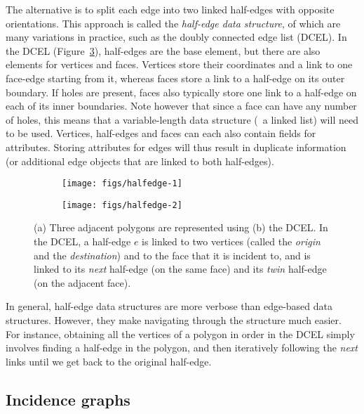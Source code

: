 The alternative is to split each edge into two linked half-edges with opposite orientations.
This approach is called the \emph{half-edge data structure}, of which are many variations in practice, such as the doubly connected edge list (DCEL).
In the DCEL (Figure~\ref{fig:halfedge}), half-edges are the base element, but there are also elements for vertices and faces.
Vertices store their coordinates and a link to one face-edge starting from it, whereas faces store a link to a half-edge on its outer boundary.
If holes are present, faces also typically store one link to a half-edge on each of its inner boundaries.
Note however that since a face can have any number of holes, this means that a variable-length data structure (\eg\ a linked list) will need to be used.
Vertices, half-edges and faces can each also contain fields for attributes.
Storing attributes for edges will thus result in duplicate information (or additional edge objects that are linked to both half-edges).

\begin{figure}
\centering
\begin{subfigure}[b]{0.27\linewidth}
\texttt{[image: figs/halfedge-1]}
\caption{}%
\label{subfig:halfedge-1}
\end{subfigure}
\quad
\begin{subfigure}[b]{0.27\linewidth}
\texttt{[image: figs/halfedge-2]}
\caption{}%
\label{subfig:halfedge-2}
\end{subfigure}
\caption{(a) Three adjacent polygons are represented using (b) the DCEL\@.
In the DCEL, a half-edge \(e\) is linked to two vertices (called the \emph{origin} and the \emph{destination}) and to the face that it is incident to, and is linked to its \emph{next} half-edge (on the same face) and its \emph{twin} half-edge (on the adjacent face).}%
\label{fig:halfedge}
\end{figure}

In general, half-edge data structures are more verbose than edge-based data structures.
However, they make navigating through the structure much easier.
For instance, obtaining all the vertices of a polygon in order in the DCEL simply involves finding a half-edge in the polygon, and then iteratively following the \emph{next} links until we get back to the original half-edge.

\subsection{Incidence graphs}

